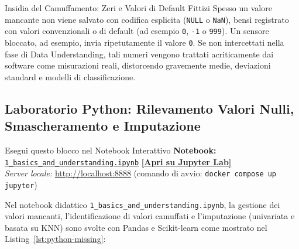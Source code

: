 \begin{alertblock}{Insidia del Camuffamento: Zeri e Valori di Default Fittizi}
Spesso un valore mancante non viene salvato con codifica esplicita (\texttt{NULL} o \texttt{NaN}), bens\`i registrato con valori convenzionali o di default (ad esempio \texttt{0}, \texttt{-1} o \texttt{999}). Un sensore bloccato, ad esempio, invia ripetutamente il valore \texttt{0}.
Se non intercettati nella fase di Data Understanding, tali numeri vengono trattati acriticamente dai software come misurazioni reali, distorcendo gravemente medie, deviazioni standard e modelli di classificazione.
\end{alertblock}

\subsection{Laboratorio Python: Rilevamento Valori Nulli, Smascheramento e Imputazione}
\label{subsec:lab-python-missing}
\begin{noteblock}{Esegui questo blocco nel Notebook Interattivo}
\textbf{Notebook:} \href{http://localhost:8888/lab/tree/notebooks/1_basics_and_understanding.ipynb}{\texttt{1\_basics\_and\_understanding.ipynb}} \hfill \href{http://localhost:8888/lab/tree/notebooks/1_basics_and_understanding.ipynb}{\textbf{[Apri su Jupyter Lab]}} \\
\textit{Server locale:} \url{http://localhost:8888} \quad (comando di avvio: \texttt{docker compose up jupyter})
\end{noteblock}
Nel notebook didattico \texttt{1\_basics\_and\_understanding.ipynb}, la gestione dei valori mancanti, l'identificazione di valori camuffati e l'imputazione (univariata e basata su KNN) sono svolte con Pandas e Scikit-learn come mostrato nel Listing~\ref{lst:python-missing}:

